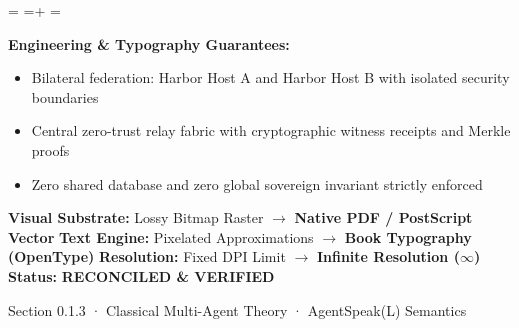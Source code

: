 \documentclass[10pt,a4paper,landscape]{article}
\newcommand{\pdautoscale}[2]{%
  \pdmaxh=#1\relax
  \pdmaxw=#2\relax
  \sbox{\pdscaledbox}{\usebox{\pdfigbox}}%
  \pdcurh=\dimexpr\ht\pdscaledbox+\dp\pdscaledbox\relax
  \pdcurw=\wd\pdscaledbox
  \ifdim\dimexpr\pdcurw * 100 / \pdmaxw\relax > \dimexpr\pdcurh * 100 / \pdmaxh\relax
    \resizebox{\pdmaxw}{!}{\usebox{\pdscaledbox}}%
  \else
    \resizebox{!}{\pdmaxh}{\usebox{\pdscaledbox}}%
  \fi
}
\begin{document}
\begin{minipage}[t]{0.492\linewidth}
  \begin{tcolorbox}[
    colback=pdcobalt!3,colframe=pdcobalt!85!black,arc=1.5pt,
    boxrule=0.7pt,top=1.5pt,bottom=1.5pt,left=4pt,right=4pt,
    title={\pdgrotesk\footnotesize\bfseries \color{white} B. Authoritative Native Vector Replacement \hfill \texttt{.tex / TikZ / PGF}}
  ]
    \begin{minipage}[c][8.3cm][c]{\linewidth}
      \centering
      \sbox{\pdfigbox}{}
      \pdautoscale{8.0cm}{\linewidth}
    \end{minipage}
    \tcblower
    \begin{minipage}[t][2.0cm][t]{\linewidth}
      \pdgrotesk\scriptsize
      \textbf{{\color{pdcobalt} Engineering \& Typography Guarantees:}}\\
      \begin{itemize}[leftmargin=9pt,itemsep=0pt,topsep=0.5pt,parsep=0pt]
        \item Bilateral federation: Harbor Host A and Harbor Host B with isolated security boundaries
        \item Central zero-trust relay fabric with cryptographic witness receipts and Merkle proofs
        \item Zero shared database and zero global sovereign invariant strictly enforced
      \end{itemize}
    \end{minipage}
  \end{tcolorbox}
\end{minipage}

\vspace*{0.05cm}
\noindent
\begin{tcolorbox}[
  colback=hhpaper,colframe=hhgray!35,arc=1.5pt,boxrule=0.4pt,
  top=1.5pt,bottom=1.5pt,left=6pt,right=6pt
]
  \pdgrotesk\scriptsize
  \noindent
  \textbf{Visual Substrate:} Lossy Bitmap Raster $\rightarrow$ \textbf{\color{pdcobalt}Native PDF / PostScript Vector}\hfill
  \textbf{Text Engine:} Pixelated Approximations $\rightarrow$ \textbf{\color{pdcobalt}Book Typography (OpenType)}\hfill
  \textbf{Resolution:} Fixed DPI Limit $\rightarrow$ \textbf{\color{pdcobalt}Infinite Resolution ($\infty$)}\hfill
  \textbf{Status:} \textbf{\color{pdteal}RECONCILED \& VERIFIED}
\end{tcolorbox}
\clearpage

\noindent
\begin{minipage}[t]{\linewidth}
  \hfill
  {\pdgrotesk\footnotesize\color{hhgray} Section 0.1.3 · Classical Multi-Agent Theory · AgentSpeak(L) Semantics}\\
  \vspace*{0.03cm}
  \noindent{\color{hhgray!40}\rule{\linewidth}{0.5pt}}
\end{minipage}
\end{document}
